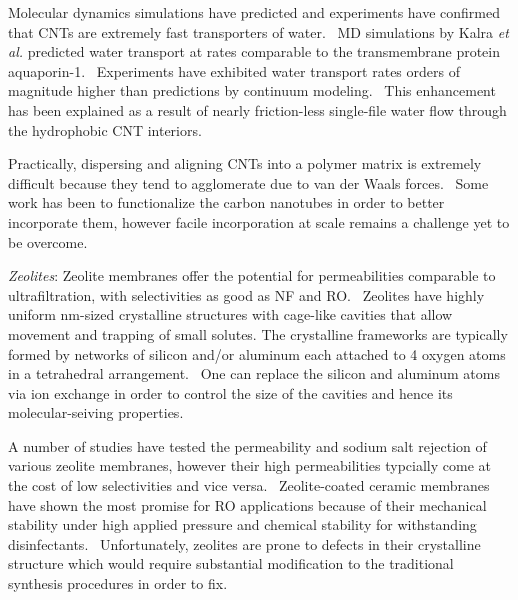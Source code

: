   Molecular dynamics simulations have predicted and experiments have confirmed that 
  CNTs are extremely fast transporters of water.~\cite{hummer_water_2001,joseph_why_2008}
  MD simulations by Kalra \textit{et al.} predicted water transport at rates comparable
  to the transmembrane protein aquaporin-1.~\cite{kalra_osmotic_2003} Experiments have 
  exhibited water transport rates orders of magnitude higher than predictions by 
  continuum modeling.~\cite{holt_fast_2006} This enhancement has been explained as a 
  result of nearly friction-less single-file water flow through the hydrophobic CNT 
  interiors.~\cite{kalra_osmotic_2003}
  
  Practically, dispersing and aligning CNTs into a polymer matrix is extremely
  difficult because they tend to agglomerate due to van der Waals forces.~\cite{sahoo_polymer_2010}
  Some work has been to functionalize the carbon nanotubes in order to better incorporate 
  them, however facile incorporation at scale remains a challenge yet to be overcome.~\cite{kim_polysulfone_2007}
  
  \textit{Zeolites}: Zeolite membranes offer the potential for permeabilities 
  comparable to ultrafiltration, with selectivities as good as NF and RO.~\cite{hoek_nanotechnology-based_2014}
  Zeolites have highly uniform nm-sized crystalline structures with cage-like
  cavities that allow movement and trapping of small solutes. The crystalline 
  frameworks are typically formed by networks of silicon and/or aluminum each 
  attached to 4 oxygen atoms in a tetrahedral arrangement.~\cite{auerbach_handbook_2003}
  One can replace the silicon and aluminum atoms via ion exchange in order
  to control the size of the cavities and hence its molecular-seiving properties.~\cite{li_novel_2007}
 
  A number of studies have tested the permeability and sodium salt rejection
  of various zeolite membranes, however their high permeabilities typcially come
  at the cost of low selectivities and vice versa.~\cite{li_desalination_2004,duke_seawater_2009}
  Zeolite-coated ceramic membranes have shown the most promise for RO applications
  because of their mechanical stability under high applied pressure and chemical
  stability for withstanding disinfectants.~\cite{pendergast_review_2011}
  Unfortunately, zeolites are prone to defects in their crystalline structure which 
  would require substantial modification to the traditional synthesis procedures
  in order to fix.~\cite{kumakiri_application_2000}

